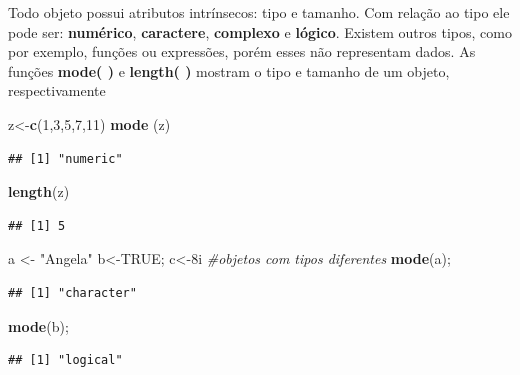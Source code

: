 \documentclass[]{book}
\newenvironment{Shaded}{\begin{snugshade}}{\end{snugshade}}
\newcommand{\CommentTok}[1]{\textcolor[rgb]{0.56,0.35,0.01}{\textit{#1}}}
\newcommand{\DecValTok}[1]{\textcolor[rgb]{0.00,0.00,0.81}{#1}}
\newcommand{\KeywordTok}[1]{\textcolor[rgb]{0.13,0.29,0.53}{\textbf{#1}}}
\newcommand{\NormalTok}[1]{#1}
\newcommand{\OtherTok}[1]{\textcolor[rgb]{0.56,0.35,0.01}{#1}}
\newcommand{\StringTok}[1]{\textcolor[rgb]{0.31,0.60,0.02}{#1}}
\begin{document}
Todo objeto possui atributos intrínsecos: tipo e tamanho. Com relação ao tipo ele pode ser: \textbf{numérico}, \textbf{caractere}, \textbf{complexo} e \textbf{lógico}. Existem outros tipos, como por exemplo, funções ou expressões, porém esses não representam dados.
As funções \textbf{mode( )} e \textbf{length( )} mostram o tipo e tamanho de um objeto, respectivamente

\begin{Shaded}
\begin{Highlighting}[]
\NormalTok{z<-}\KeywordTok{c}\NormalTok{(}\DecValTok{1}\NormalTok{,}\DecValTok{3}\NormalTok{,}\DecValTok{5}\NormalTok{,}\DecValTok{7}\NormalTok{,}\DecValTok{11}\NormalTok{) }
\KeywordTok{mode}\NormalTok{ (z)}
\end{Highlighting}
\end{Shaded}

\begin{verbatim}
## [1] "numeric"
\end{verbatim}

\begin{Shaded}
\begin{Highlighting}[]
\KeywordTok{length}\NormalTok{(z)}
\end{Highlighting}
\end{Shaded}

\begin{verbatim}
## [1] 5
\end{verbatim}

\begin{Shaded}
\begin{Highlighting}[]
\NormalTok{a <-}\StringTok{ "Angela"}
\NormalTok{b<-}\OtherTok{TRUE}\NormalTok{; }
\NormalTok{c<-8i }\CommentTok{#objetos com tipos diferentes}
\KeywordTok{mode}\NormalTok{(a); }
\end{Highlighting}
\end{Shaded}

\begin{verbatim}
## [1] "character"
\end{verbatim}

\begin{Shaded}
\begin{Highlighting}[]
\KeywordTok{mode}\NormalTok{(b); }
\end{Highlighting}
\end{Shaded}

\begin{verbatim}
## [1] "logical"
\end{verbatim}
\end{document}
